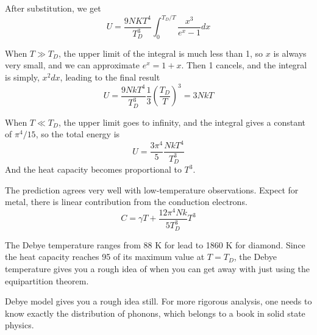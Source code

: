 After substitution, we get
\begin{equation}
U = \frac{9NKT^4}{T_D^3} \int _0 ^{T_D/T} \frac{x^3}{e^x -1} dx
\end{equation}

When $T \gg T_D$, the upper limit of the integral is much less than 1, so $x$ is always very small, and we 
can approximate $e^x = 1+x$. Then 1 cancels, and the integral is simply, $x^2dx$, leading to the final result
\begin{equation}
 U = \frac{9NkT^4}{T_D^3} \frac{1}{3} (\frac{T_D}{T})^3 = 3NkT
\end{equation}

When $T \ll T_D$, the upper limit goes to infinity, and the integral gives a constant of $\pi^4/15$, so the total energy is
\begin{equation}
U = \frac{3\pi^4}{5} \frac{NkT^4}{T_D^3}
\end{equation}
And the heat capacity becomes proportional to $T^3$.

The prediction agrees very well with low-temperature observations. Expect for metal, there is linear contribution from the conduction electrons.
\begin{equation}
C = \gamma T + \frac{12\pi^4Nk}{5T_D^3} T^3
\end{equation}

The Debye temperature ranges from 88 K for lead to 1860 K for diamond. Since the heat capacity reaches 95 of its maximum value at $T=T_D$, the Debye
temperature gives you a rough idea of when you can get away with just using the equipartition theorem. 

Debye model gives you a rough idea still. For more rigorous analysis, one needs to know exactly the distribution of phonons, which belongs
to a book in solid state physics.

